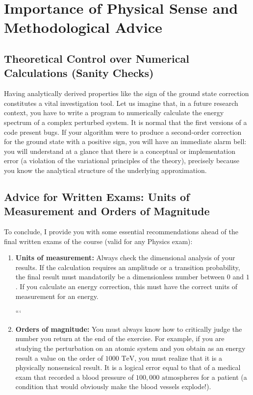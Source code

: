 \section{Importance of Physical Sense and Methodological Advice}

\subsection{Theoretical Control over Numerical Calculations (Sanity Checks)}
Having analytically derived properties like the sign of the ground state correction constitutes a vital investigation tool.
Let us imagine that, in a future research context, you have to write a program to numerically calculate the energy spectrum of a complex perturbed system. It is normal that the first versions of a code present bugs. If your algorithm were to produce a second-order correction for the ground state with a positive sign, you will have an immediate alarm bell: you will understand at a glance that there is a conceptual or implementation error (a violation of the variational principles of the theory), precisely because you know the analytical structure of the underlying approximation.

\subsection{Advice for Written Exams: Units of Measurement and Orders of Magnitude}
To conclude, I provide you with some essential recommendations ahead of the final written exams of the course (valid for any Physics exam):

\begin{enumerate}
\item \textbf{Units of measurement:} Always check the dimensional analysis of your results. If the calculation requires an amplitude or a transition probability, the final result must mandatorily be a dimensionless number between $0$ and $1$. If you calculate an energy correction, this must have the correct units of measurement for an energy.


```

\item \textbf{Orders of magnitude:} You must always know how to critically judge the number you return at the end of the exercise. For example, if you are studying the perturbation on an atomic system and you obtain as an energy result a value on the order of $1000 \text{ TeV}$, you must realize that it is a physically nonsensical result. It is a logical error equal to that of a medical exam that recorded a blood pressure of $100,000 \text{ atmospheres}$ for a patient (a condition that would obviously make the blood vessels explode!).


\end{enumerate}

